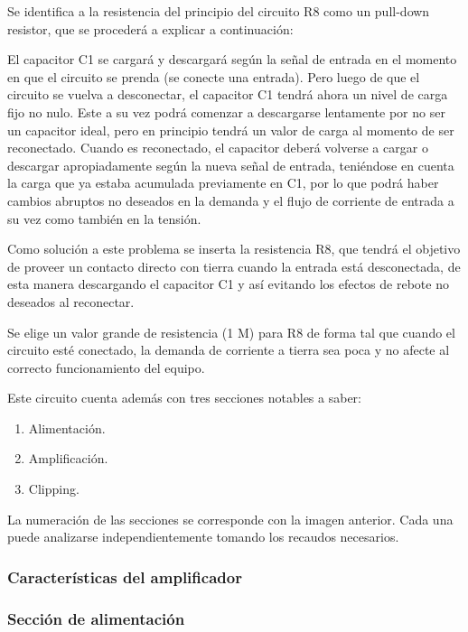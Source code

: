 \documentclass[../../main.tex]{subfiles}
\begin{document}
Se identifica a la resistencia del principio del circuito R8 como un pull-down resistor, que se procederá a explicar a continuación: \par
El capacitor C1 se cargará y descargará según la señal de entrada en el momento en que el circuito se prenda (se conecte una entrada). Pero luego de que el circuito se vuelva a desconectar, el capacitor C1 tendrá ahora un nivel de carga fijo no nulo. Este a su vez podrá comenzar a descargarse lentamente por no ser un capacitor ideal, pero en principio tendrá un valor de carga al momento de ser reconectado. Cuando es reconectado, el capacitor deberá volverse a cargar o descargar apropiadamente según la nueva señal de entrada, teniéndose en cuenta la carga que ya estaba acumulada previamente en C1, por lo que podrá haber cambios abruptos no deseados en la demanda y el flujo de corriente de entrada a su vez como también en la tensión. \par
Como solución a este problema se inserta la resistencia R8, que tendrá el objetivo de proveer un contacto directo con tierra cuando la entrada está desconectada, de esta manera descargando el capacitor C1 y así evitando los efectos de rebote no deseados al reconectar.\par
Se elige un valor grande de resistencia (1 M\ohm) para R8 de forma tal que cuando el circuito esté conectado, la demanda de corriente a tierra sea poca y no afecte al correcto funcionamiento del equipo. \par

Este circuito cuenta además con tres secciones notables a saber: 
\begin{enumerate}
\item Alimentación.
\item Amplificación.
\item Clipping.
\end{enumerate}
La numeración de las secciones se corresponde con la imagen anterior. Cada una puede analizarse independientemente tomando los recaudos necesarios.

\subsubsection{Caracter\'isticas del amplificador}
\subsubsection{Secci\'on de alimentaci\'on}
\end{document}
